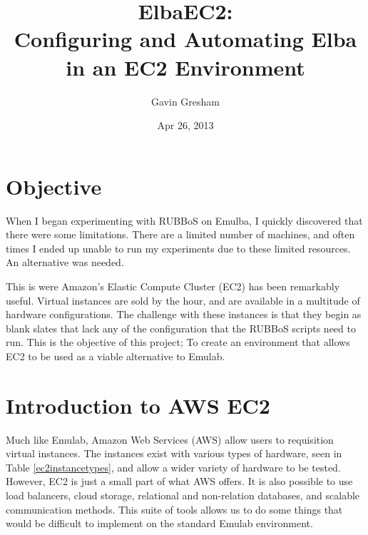 \documentclass{article}
\begin{document}
\title{ElbaEC2:\\Configuring and Automating Elba in an EC2 Environment}
\author{Gavin Gresham}
\date{Apr 26, 2013}
\maketitle

\tableofcontents
\pagebreak

\section{Objective}
When I began experimenting with RUBBoS on Emulba, I quickly discovered that there were some limitations. There are a limited number of machines, and often times I ended up unable to run my experiments due to these limited resources. An alternative was needed.

This is were Amazon's Elastic Compute Cluster (EC2) has been remarkably useful. Virtual instances are sold by the hour, and are available in a multitude of hardware configurations. The challenge with these instances is that they begin as blank slates that lack any of the configuration that the RUBBoS scripts need to run. This is the objective of this project; To create an environment that allows EC2 to be used as a viable alternative to Emulab.
\section{Introduction to AWS EC2}
Much like Emulab, Amazon Web Services (AWS) allow users to requisition virtual instances. The instances exist with various types of hardware, seen in Table \ref{ec2instancetypes}, and allow a wider variety of hardware to be tested. However, EC2 is just a small part of what AWS offers. It is also possible to use load balancers, cloud storage, relational and non-relation databases, and scalable communication methods. This suite of tools allows us to do some things that would be difficult to implement on the standard Emulab environment.
\end{document}
